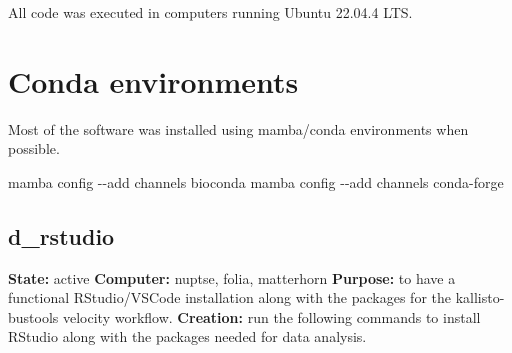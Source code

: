 \documentclass[
  letterpaper,
  DIV=11,
  numbers=noendperiod]{scrreprt}
\newenvironment{Shaded}{\begin{snugshade}}{\end{snugshade}}
\newcommand{\AttributeTok}[1]{\textcolor[rgb]{0.40,0.45,0.13}{#1}}
\newcommand{\ExtensionTok}[1]{\textcolor[rgb]{0.00,0.23,0.31}{#1}}
\newcommand{\NormalTok}[1]{\textcolor[rgb]{0.00,0.23,0.31}{#1}}
\begin{document}
All code was executed in computers running Ubuntu 22.04.4 LTS.

\section{Conda environments}\label{conda-environments}

Most of the software was installed using mamba/conda environments when
possible.

\begin{Shaded}
\begin{Highlighting}[]
\ExtensionTok{mamba}\NormalTok{ config }\AttributeTok{{-}{-}add}\NormalTok{ channels bioconda}
\ExtensionTok{mamba}\NormalTok{ config }\AttributeTok{{-}{-}add}\NormalTok{ channels conda{-}forge}
\end{Highlighting}
\end{Shaded}

\subsection{d\_rstudio}\label{d_rstudio}

\textbf{State:} active \textbf{Computer:} nuptse, folia, matterhorn
\textbf{Purpose:} to have a functional RStudio/VSCode installation along
with the packages for the kallisto-bustools velocity workflow.
\textbf{Creation:} run the following commands to install RStudio along
with the packages needed for data analysis.
\end{document}
